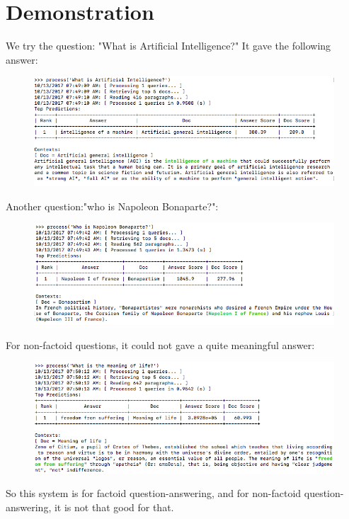 \documentclass[12pt]{article}
\numberwithin{equation}{section}
\begin{document}
\section{Demonstration}	
We try the question: "What is Artificial Intelligence?" It gave the following answer:
	\begin{figure}[H]
		\includegraphics[width=\linewidth]{fig_QA/demo.png}
		\label{fig:demo}
	\end{figure} \par
Another question:"who is Napoleon Bonaparte?":
	\begin{figure}[H]
		\includegraphics[width=\linewidth]{fig_QA/demo2.png}
		\label{fig:demo2}
	\end{figure} \par
For non-factoid questions, it could not gave a quite meaningful answer:
	\begin{figure}[H]
		\includegraphics[width=\linewidth]{fig_QA/demo3.png}
		\label{fig:demo3}
	\end{figure} \par
So this system is for factoid question-answering, and for non-factoid question-answering, it is not that good for that. \par
\end{document}
